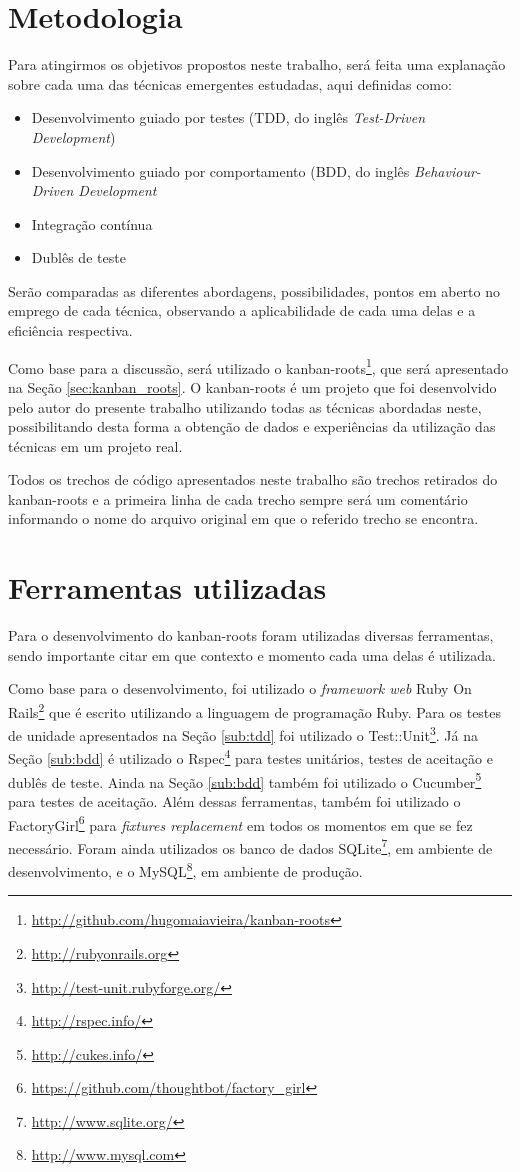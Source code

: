 \section{Metodologia}

Para atingirmos os objetivos propostos neste trabalho, será feita uma explanação sobre cada uma das técnicas emergentes estudadas, aqui definidas como:

\begin{itemize}
  \item Desenvolvimento guiado por testes (TDD, do inglês \textit{Test-Driven Development})
  \item Desenvolvimento guiado por comportamento (BDD, do inglês \textit{Behaviour-Driven Development}
  \item Integração contínua
  \item Dublês de teste
\end{itemize}

Serão comparadas as diferentes abordagens, possibilidades, pontos em aberto no emprego de cada técnica, observando a aplicabilidade de cada uma delas e a eficiência respectiva.

Como base para a discussão, será utilizado o kanban-roots\footnote{\url{http://github.com/hugomaiavieira/kanban-roots}}, que será apresentado na Seção \ref{sec:kanban_roots}. O kanban-roots é um projeto que foi desenvolvido pelo autor do presente trabalho utilizando todas as técnicas abordadas neste, possibilitando desta forma a obtenção de dados e experiências da utilização das técnicas em um projeto real.

Todos os trechos de código apresentados neste trabalho são trechos retirados do kanban-roots e a primeira linha de cada trecho sempre será um comentário informando o nome do arquivo original em que o referido trecho se encontra.

\section{Ferramentas utilizadas}

Para o desenvolvimento do kanban-roots foram utilizadas diversas ferramentas, sendo importante citar em que contexto e momento cada uma delas é utilizada.

Como base para o desenvolvimento, foi utilizado o \textit{framework web} Ruby On Rails\footnote{\url{http://rubyonrails.org}} que é escrito utilizando a linguagem de programação Ruby. Para os testes de unidade apresentados na Seção \ref{sub:tdd} foi utilizado o Test::Unit\footnote{\url{http://test-unit.rubyforge.org/}}. Já na Seção \ref{sub:bdd} é utilizado o Rspec\footnote{\url{http://rspec.info/}} para testes unitários, testes de aceitação e dublês de teste. Ainda na Seção \ref{sub:bdd} também foi utilizado o Cucumber\footnote{\url{http://cukes.info/}} para testes de aceitação. Além dessas ferramentas, também foi utilizado o FactoryGirl\footnote{\url{https://github.com/thoughtbot/factory_girl}} para \textit{fixtures replacement} em todos os momentos em que se fez necessário. Foram ainda utilizados os banco de dados SQLite\footnote{\url{http://www.sqlite.org/}}, em ambiente de desenvolvimento, e o MySQL\footnote{\url{http://www.mysql.com}}, em ambiente de produção.

